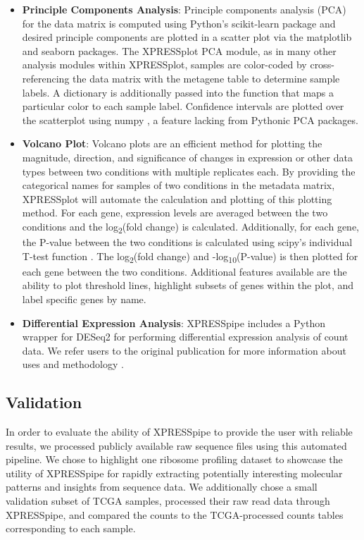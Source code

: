 \documentclass[11pt, a4paper, oneside]{article}
\begin{document}
\begin{itemize}
  \item \textbf{Principle Components Analysis}: Principle components analysis (PCA) for the data matrix is computed using Python's scikit-learn package \cite{scikit_learn} and desired principle components are plotted in a scatter plot via the matplotlib \cite{matplotlib} and seaborn \cite{seaborn} packages. The XPRESSplot PCA module, as in many other analysis modules within XPRESSplot, samples are color-coded by cross-referencing the data matrix with the metagene table to determine sample labels. A dictionary is additionally passed into the function that maps a particular color to each sample label. Confidence intervals are plotted over the scatterplot using numpy \cite{numpy1, numpy2}, a feature lacking from Pythonic PCA packages.

  \item \textbf{Volcano Plot}: Volcano plots are an efficient method for plotting the magnitude, direction, and significance of changes in expression or other data types between two conditions with multiple replicates each. By providing the categorical names for samples of two conditions in the metadata matrix, XPRESSplot will automate the calculation and plotting of this plotting method. For each gene, expression levels are averaged between the two conditions and the log\textsubscript{2}(fold change) is calculated. Additionally, for each gene, the P-value between the two conditions is calculated using scipy's individual T-test function \cite{scipy}. The log\textsubscript{2}(fold change) and -log\textsubscript{10}(P-value) is then plotted for each gene between the two conditions. Additional features available are the ability to plot threshold lines, highlight subsets of genes within the plot, and label specific genes by name.

  \item \textbf{Differential Expression Analysis}: XPRESSpipe includes a Python wrapper for DESeq2 for performing differential expression analysis of count data. We refer users to the original publication for more information about uses and methodology \cite{deseq2}.

\end{itemize}

\subsection{Validation}
In order to evaluate the ability of XPRESSpipe to provide the user with reliable results, we processed publicly available raw sequence files using this automated pipeline. We chose to highlight one ribosome profiling dataset to showcase the utility of XPRESSpipe for rapidly extracting potentially interesting molecular patterns and insights from sequence data. We additionally chose a small validation subset of TCGA samples, processed their raw read data through XPRESSpipe, and compared the counts to the TCGA-processed counts tables corresponding to each sample.
\end{document}
